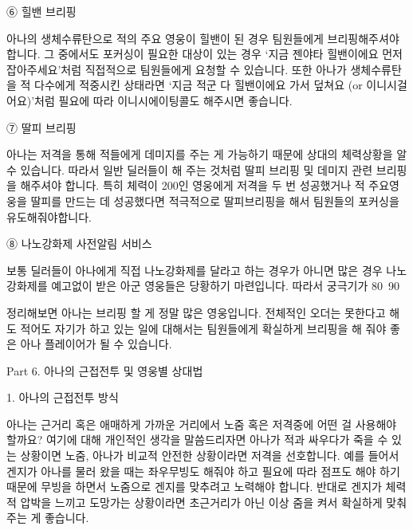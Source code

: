  

⑥ 힐밴 브리핑

아나의 생체수류탄으로 적의 주요 영웅이 힐밴이 된 경우 팀원들에게 브리핑해주셔야 합니다. 그 중에서도 포커싱이 필요한 대상이 있는 경우 ‘지금 젠야타 힐밴이에요 먼저 잡아주세요’처럼 직접적으로 팀원들에게 요청할 수 있습니다. 또한 아나가 생체수류탄을 적 다수에게 적중시킨 상태라면 ‘지금 적군 다 힐밴이에요 가서 덮쳐요 (or 이니시걸어요)’처럼 필요에 따라 이니시에이팅콜도 해주시면 좋습니다.

 

⑦ 딸피 브리핑

아나는 저격을 통해 적들에게 데미지를 주는 게 가능하기 때문에 상대의 체력상황을 알 수 있습니다. 따라서 일반 딜러들이 해 주는 것처럼 딸피 브리핑 및 데미지 관련 브리핑을 해주셔야 합니다. 특히 체력이 200인 영웅에게 저격을 두 번 성공했거나 적 주요영웅을 딸피를 만드는 데 성공했다면 적극적으로 딸피브리핑을 해서 팀원들의 포커싱을 유도해줘야합니다.

 

⑧ 나노강화제 사전알림 서비스

보통 딜러들이 아나에게 직접 나노강화제를 달라고 하는 경우가 아니면 많은 경우 나노강화제를 예고없이 받은 아군 영웅들은 당황하기 마련입니다. 따라서 궁극기가 80~90%

 

정리해보면 아나는 브리핑 할 게 정말 많은 영웅입니다. 전체적인 오더는 못한다고 해도 적어도 자기가 하고 있는 일에 대해서는 팀원들에게 확실하게 브리핑을 해 줘야 좋은 아나 플레이어가 될 수 있습니다.

 

 

 

Part 6. 아나의 근접전투 및 영웅별 상대법

 

1. 아나의 근접전투 방식

 

아나는 근거리 혹은 애매하게 가까운 거리에서 노줌 혹은 저격중에 어떤 걸 사용해야 할까요? 여기에 대해 개인적인 생각을 말씀드리자면 아나가 적과 싸우다가 죽을 수 있는 상황이면 노줌, 아나가 비교적 안전한 상황이라면 저격을 선호합니다. 예를 들어서 겐지가 아나를 물러 왔을 때는 좌우무빙도 해줘야 하고 필요에 따라 점프도 해야 하기 때문에 무빙을 하면서 노줌으로 겐지를 맞추려고 노력해야 합니다. 반대로 겐지가 체력적 압박을 느끼고 도망가는 상황이라면 초근거리가 아닌 이상 줌을 켜서 확실하게 맞춰주는 게 좋습니다.

